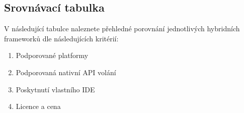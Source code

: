 \subsection{Srovnávací tabulka}
V následující tabulce naleznete přehledné porovnání jednotlivých hybridních frameworků dle následujících kritérií:

\begin{enumerate}
	\item Podporované platformy
	\item Podporovaná nativní API volání
	\item Poskytnutí vlastního IDE
	\item Licence a cena
\end{enumerate}

